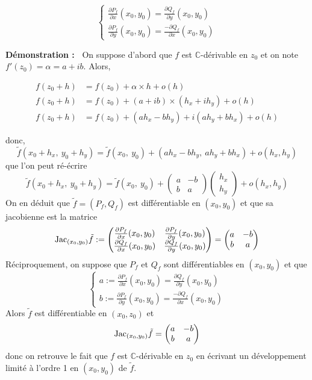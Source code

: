\documentclass[5pt,a4paper]{article}
\newcommand{\demo}[1]{
    \textbf{Démonstration :~} #1 \newline
}
\begin{document}
\begin{onehalfspacing}
{\[
    \left\{\begin{aligned}
        \frac{\partial P_f}{\partial x}(x_0, y_0) = \frac{\partial Q_f}{\partial y}(x_0, y_0) \\
        \frac{\partial P_f}{\partial y}(x_0, y_0) = \frac{-\partial Q_f}{\partial x}(x_0, y_0)
    \end{aligned}\right.
\]
}
\demo{On suppose d'abord que $f$ est $\mathbb{C}$-dérivable en $z_0$ et on note $f'(z_0) = \alpha = a + ib$. Alors, 

\begin{align*}
    f(z_0 + h) &= f(z_0) + \alpha \times h + o(h) \\
    f(z_0 + h) &= f(z_0) + (a + ib) \times (h_x + ih_y) + o(h) \\
    f(z_0 + h) &= f(z_0) + (ah_x - bh_y) + i(ah_y + bh_x) + o(h)
\end{align*}

donc, 
\[
    \tilde{f}(x_0 + h_x,~ y_0 + h_y) = \tilde{f}(x_0,~ y_0) + (ah_x - bh_y,~ ah_y + bh_x) + o(h_x, h_y)
\]
que l'on peut ré-écrire 
\[
    \tilde{f}(x_0 + h_x,~ y_0 + h_y) = \tilde{f}(x_0,~ y_0) + 
        \begin{pmatrix}
            a & -b \\
            b & a
        \end{pmatrix}
        \begin{pmatrix}
            h_x \\
            h_y
        \end{pmatrix}
    + o(h_x, h_y)
\]
On en déduit que $\tilde{f} = (P_f, Q_f)$ est différentiable en $(x_0, y_0)$ et que sa jacobienne est la matrice 
\[
 \textup{Jac}_{(x_0, y_0)} \tilde{f} := 
    \begin{pmatrix}
        \frac{\partial P_f}{\partial x}(x_0, y_0) & \frac{\partial P_f}{\partial y}(x_0, y_0) \\
        \frac{\partial Q_f}{\partial x}(x_0, y_0) & \frac{\partial Q_f}{\partial y}(x_0, y_0)
    \end{pmatrix}
    =
    \begin{pmatrix}
        a & -b \\
        b & a
    \end{pmatrix}
\]
Réciproquement, on suppose que $P_f$ et $Q_f$ sont différentiables en $(x_0, y_0)$ et que
\[
    \left\{\begin{aligned}
        a := \frac{\partial P_f}{\partial x}(x_0, y_0) = \frac{\partial Q_f}{\partial y}(x_0, y_0) \\
        b := \frac{\partial P_f}{\partial y}(x_0, y_0) = \frac{-\partial Q_f}{\partial x}(x_0, y_0)
    \end{aligned}\right.
\]
Alors $\tilde{f}$ est différentiable en $(x_0, z_0)$ et 
\[  
    \textup{Jac}_{(x_0, y_0)} \tilde{f}
    =
    \begin{pmatrix}
        a & -b \\
        b & a
    \end{pmatrix}
\]
donc on retrouve le fait que $f$ est $\mathbb{C}$-dérivable en $z_0$ en écrivant un développement limité à l'ordre 1 en $(x_0, y_0)$ de $\tilde{f}$.
}


\end{onehalfspacing}
\end{document}
